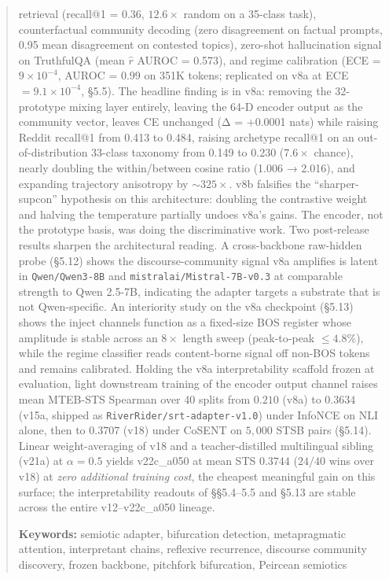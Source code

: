 \documentclass[
  11pt]{article}
\begin{document}
\begin{abstract}
retrieval (recall@1 = 0.36, \(12.6\times\) random on a 35-class task),
counterfactual community decoding (zero disagreement on factual prompts,
0.95 mean disagreement on contested topics), zero-shot hallucination
signal on TruthfulQA (mean \(\hat{r}\) AUROC = 0.573), and regime
calibration (ECE = \(9\times10^{-4}\), AUROC = 0.99 on 351K tokens;
replicated on v8a at ECE \(= 9.1\times 10^{-4}\), §5.5). The headline
finding is in v8a: removing the 32-prototype mixing layer entirely,
leaving the 64-D encoder output as the community vector, leaves CE
unchanged (Δ = +0.0001 nats) while raising Reddit recall@1 from 0.413 to
0.484, raising archetype recall@1 on an out-of-distribution 33-class
taxonomy from 0.149 to 0.230 (\(7.6\times\) chance), nearly doubling the
within/between cosine ratio (1.006 → 2.016), and expanding trajectory
anisotropy by \(\sim\)\(325\times\). v8b falsifies the
``sharper-supcon'' hypothesis on this architecture: doubling the
contrastive weight and halving the temperature partially undoes v8a's
gains. The encoder, not the prototype basis, was doing the
discriminative work. Two post-release results sharpen the architectural
reading. A cross-backbone raw-hidden probe (§5.12) shows the
discourse-community signal v8a amplifies is latent in
\texttt{Qwen/Qwen3-8B} and \texttt{mistralai/Mistral-7B-v0.3} at
comparable strength to Qwen 2.5-7B, indicating the adapter targets a
substrate that is not Qwen-specific. An interiority study on the v8a
checkpoint (§5.13) shows the inject channels function as a fixed-size
BOS register whose amplitude is stable across an \(8\times\) length
sweep (peak-to-peak \(\leq 4.8\%\)), while the regime classifier reads
content-borne signal off non-BOS tokens and remains calibrated. Holding
the v8a interpretability scaffold frozen at evaluation, light downstream
training of the encoder output channel raises mean MTEB-STS Spearman
over 40 splits from \(0.210\) (v8a) to \(0.3634\) (v15a, shipped as
\texttt{RiverRider/srt-adapter-v1.0}) under InfoNCE on NLI alone, then
to \(0.3707\) (v18) under CoSENT on \(5{,}000\) STSB pairs (§5.14).
Linear weight-averaging of v18 and a teacher-distilled multilingual
sibling (v21a) at \(\alpha = 0.5\) yields v22c\_a050 at mean STS
\(0.3744\) (\(24/40\) wins over v18) at \emph{zero additional training
cost}, the cheapest meaningful gain on this surface; the
interpretability readouts of §§5.4--5.5 and §5.13 are stable across the
entire v12--v22c\_a050 lineage.

\vspace{0.5em}

\noindent\textbf{Keywords:} semiotic adapter, bifurcation detection,
metapragmatic attention, interpretant chains, reflexive recurrence,
discourse community discovery, frozen backbone, pitchfork bifurcation,
Peircean semiotics
\end{abstract}
\end{document}
